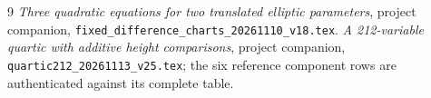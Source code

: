 \documentclass[11pt,a4paper]{article}
\begin{document}
\begin{thebibliography}{9}
 \emph{Three quadratic equations for two translated elliptic parameters},
project companion, \nolinkurl{fixed_difference_charts_20261110_v18.tex}.
 \emph{A 212-variable quartic with additive height comparisons},
project companion, \nolinkurl{quartic212_20261113_v25.tex};
the six reference component rows are authenticated against its complete table.
\end{thebibliography}
\end{document}
